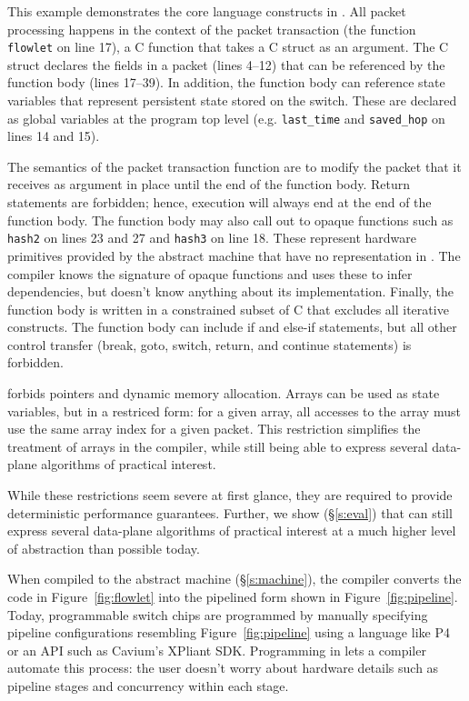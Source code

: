 This example demonstrates the core language constructs in \pktlanguage. All
packet processing happens in the context of the packet transaction (the
function \texttt{flowlet} on line 17), a C function that takes a C struct as an
argument. The C struct declares the fields in a packet (lines 4--12) that can
be referenced by the function body (lines 17--39).  In addition, the function
body can reference state variables that represent persistent state stored on
the switch. These are declared as global variables at the program top level
(e.g. \texttt{last\_time} and \texttt{saved\_hop} on lines 14 and 15).

The semantics of the packet transaction function are to modify the packet that
it receives as argument in place until the end of the function body. Return
statements are forbidden; hence, execution will always end at the end of
the function body. The function body may also call out to opaque functions such
as \texttt{hash2} on lines 23 and 27 and \texttt{hash3} on line 18. These
represent hardware primitives provided by the abstract machine that have no
representation in \pktlanguage. The \pktlanguage compiler knows the signature
of opaque functions and uses these to infer dependencies, but doesn't know
anything about its implementation. Finally, the function body is written in a
constrained subset of C that excludes all iterative constructs. The function
body can include if and else-if statements, but all other control transfer
(break, goto, switch, return, and continue statements) is forbidden.

\pktlanguage forbids pointers and dynamic memory allocation. Arrays can be used
as state variables, but in a restriced form: for a given array, all accesses to
the array must use the same array index for a given packet. This restriction
simplifies the treatment of arrays in the compiler, while still being able to
express several data-plane algorithms of practical interest.

While these restrictions seem severe at first glance, they are required to
provide deterministic performance guarantees. Further, we show (\S\ref{s:eval})
that \pktlanguage can still express several data-plane algorithms  of practical
interest at a much higher level of abstraction than possible today.

When compiled to the \absmachine abstract machine (\S\ref{s:machine}), the
\pktlanguage compiler converts the code in Figure~\ref{fig:flowlet} into the
pipelined form shown in Figure~\ref{fig:pipeline}. Today, programmable switch
chips are programmed by manually specifying pipeline configurations resembling
Figure~\ref{fig:pipeline} using a language like P4 or an API such as Cavium's
XPliant SDK. Programming in \pktlanguage lets a compiler automate this process:
the user doesn't worry about hardware details such as pipeline stages and
concurrency within each stage.
